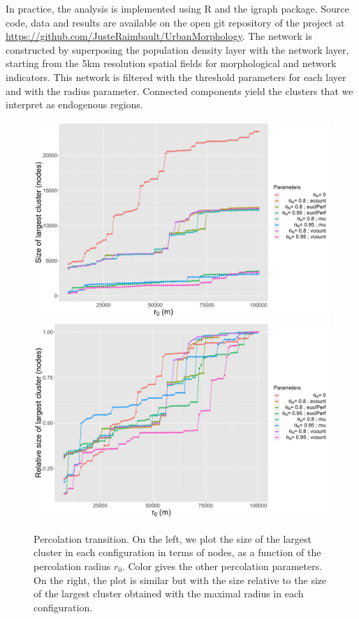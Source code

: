 \documentclass{jimis-en}
\begin{document}
In practice, the analysis is implemented using R and the igraph package. Source code, data and results are available on the open git repository of the project at \url{https://github.com/JusteRaimbault/UrbanMorphology}. The network is constructed by superposing the population density layer with the network layer, starting from the 5km resolution spatial fields for morphological and network indicators. This network is filtered with the threshold parameters for each layer and with the radius parameter. Connected components yield the clusters that we interpret as endogenous regions.



\begin{figure}[ht] 
  {\includegraphics[width=0.49\linewidth]{figures/abssize_nodes.png}}
  {\includegraphics[width=0.49\linewidth]{figures/relsize_nodes.png}}
  \centering
  \caption{Percolation transition. On the left, we plot the size of the largest cluster in each configuration in terms of nodes, as a function of the percolation radius $r_0$. Color gives the other percolation parameters. On the right, the plot is similar but with the size relative to the size of the largest cluster obtained with the maximal radius in each configuration.\label{fig:percolation}}
\end{figure}
\end{document}
